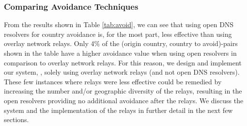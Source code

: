 \subsubsection{Comparing Avoidance Techniques}

From the results shown in Table \ref{tab:avoid}, we can see that using open DNS resolvers for country avoidance is, for the most part, less effective than using overlay network relays.  Only 4\% of the (origin country, country to avoid)-pairs shown in the table have a higher avoidance value when using open resolvers in comparison to overlay network relays.  For this reason, we design and implement our system, \system{}, solely using overlay network relays (and not open DNS resolvers).  These few instances where relays were less effective could be remedied by increasing the number and/or geographic diversity of the relays, resulting in the open resolvers providing no additional avoidance after the relays.  We discuss the system and the implementation of the relays in further detail in the next few sections.
